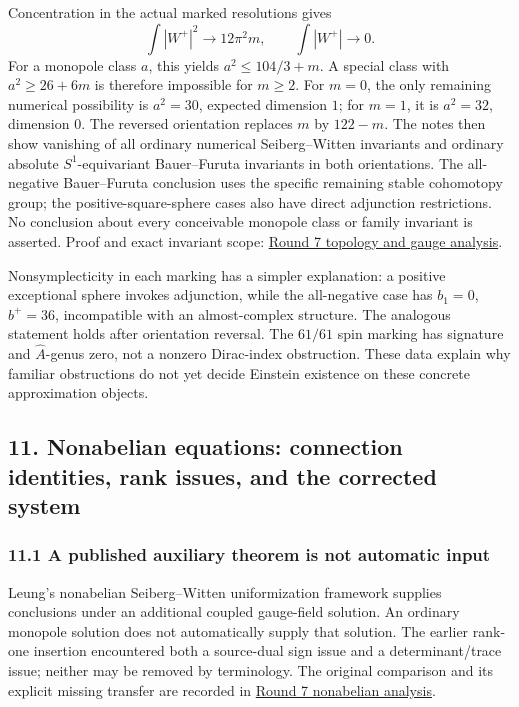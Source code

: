 \documentclass[
  english,
]{article}
\begin{document}
Concentration in the actual marked resolutions gives \[
 \int|W^+|^2\longrightarrow12\pi^2m,\qquad
 \int|W^+|\longrightarrow0.
\] For a monopole class \(a\), this yields \(a^2\le104/3+m\). A special
class with \(a^2\ge26+6m\) is therefore impossible for \(m\ge2\). For
\(m=0\), the only remaining numerical possibility is \(a^2=30\),
expected dimension \(1\); for \(m=1\), it is \(a^2=32\), dimension
\(0\). The reversed orientation replaces \(m\) by \(122-m\). The notes
then show vanishing of all ordinary numerical Seiberg--Witten invariants
and ordinary absolute \(S^1\)-equivariant Bauer--Furuta invariants in
both orientations. The all-negative Bauer--Furuta conclusion uses the
specific remaining stable cohomotopy group; the positive-square-sphere
cases also have direct adjunction restrictions. No conclusion about
every conceivable monopole class or family invariant is asserted. Proof
and exact invariant scope: \href{../proofs/round7_topology.md}{Round 7
topology and gauge analysis}.

Nonsymplecticity in each marking has a simpler explanation: a positive
exceptional sphere invokes adjunction, while the all-negative case has
\(b_1=0\), \(b^+=36\), incompatible with an almost-complex structure.
The analogous statement holds after orientation reversal. The \(61/61\)
spin marking has signature and \(\widehat A\)-genus zero, not a nonzero
Dirac-index obstruction. These data explain why familiar obstructions do
not yet decide Einstein existence on these concrete approximation
objects.

\hypertarget{nonabelian-equations-connection-identities-rank-issues-and-the-corrected-system}{%
\subsection{11. Nonabelian equations: connection identities, rank
issues, and the corrected
system}\label{nonabelian-equations-connection-identities-rank-issues-and-the-corrected-system}}

\hypertarget{a-published-auxiliary-theorem-is-not-automatic-input}{%
\subsubsection{11.1 A published auxiliary theorem is not automatic
input}\label{a-published-auxiliary-theorem-is-not-automatic-input}}

Leung's nonabelian Seiberg--Witten uniformization framework supplies
conclusions under an additional coupled gauge-field solution. An
ordinary monopole solution does not automatically supply that solution.
The earlier rank-one insertion encountered both a source-dual sign issue
and a determinant/trace issue; neither may be removed by terminology.
The original comparison and its explicit missing transfer are recorded
in \href{../proofs/round7_rigidity.md}{Round 7 nonabelian analysis}.
\end{document}
